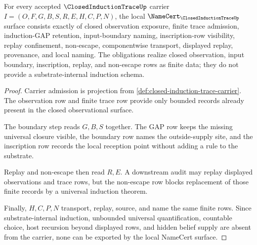 \begin{theorem}
\label{thm:closed-induction-trace-namecert-obligations}
For every accepted $\ClosedInductionTraceUp$ carrier $I=(O,F,G,B,S,R,E,H,C,P,N)$, the local $\NameCert_{\ClosedInductionTraceUp}$ surface consists exactly of closed observation exposure, finite trace admission, induction-GAP retention, input-boundary naming, inscription-row visibility, replay confinement, non-escape, componentwise transport, displayed replay, provenance, and local naming. The obligations realize closed observation, input boundary, inscription, replay, and non-escape rows as finite data; they do not provide a substrate-internal induction schema.
\end{theorem}
\begin{proof}
Carrier admission is projection from \autoref{def:closed-induction-trace-carrier}. The observation row and finite trace row provide only bounded records already present in the closed observational surface.

The boundary step reads $G,B,S$ together. The GAP row keeps the missing universal closure visible, the boundary row names the outside-supply site, and the inscription row records the local reception point without adding a rule to the substrate.

Replay and non-escape then read $R,E$. A downstream audit may replay displayed observations and trace rows, but the non-escape row blocks replacement of those finite records by a universal induction theorem.

Finally, $H,C,P,N$ transport, replay, source, and name the same finite rows. Since substrate-internal induction, unbounded universal quantification, countable choice, host recursion beyond displayed rows, and hidden belief supply are absent from the carrier, none can be exported by the local NameCert surface.
\end{proof}




